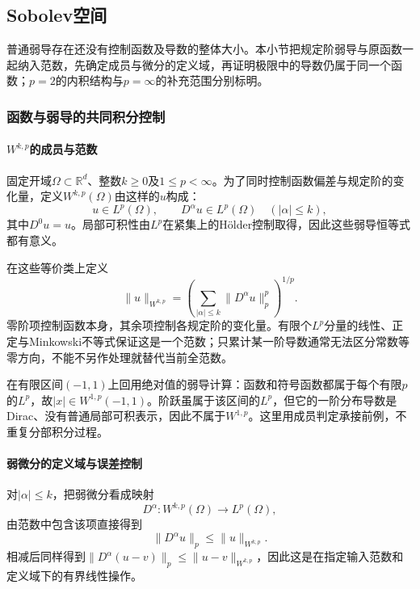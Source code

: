 \subsection{Sobolev空间}
\label{subsec:sobolev-spaces}

普通弱导存在还没有控制函数及导数的整体大小。本小节把规定阶弱导与原函数一起纳入范数，先确定成员与微分的定义域，再证明极限中的导数仍属于同一个函数；$p=2$的内积结构与$p=\infty$的补充范围分别标明。

\subsubsection{函数与弱导的共同积分控制}
\label{subsubsec:sobolev-members-norm}

\paragraph{$W^{k,p}$的成员与范数}

固定开域$\Omega\subset\mathbb R^d$、整数$k\ge0$及$1\le p<\infty$。为了同时控制函数偏差与规定阶的变化量，定义$W^{k,p}(\Omega)$由这样的$u$构成：
\[
  u\in L^p(\Omega),\qquad D^\alpha u\in L^p(\Omega)\quad(|\alpha|\le k),
\]
其中$D^0u=u$。局部可积性由$L^p$在紧集上的Hölder控制取得，因此这些弱导恒等式都有意义。

在这些等价类上定义
\begin{equation}
  \|u\|_{W^{k,p}}
  =\left(\sum_{|\alpha|\le k}\|D^\alpha u\|_p^p\right)^{1/p}.
  \label{eq:functional-sobolev-norm}
\end{equation}
零阶项控制函数本身，其余项控制各规定阶的变化量。有限个$L^p$分量的线性、正定与Minkowski不等式保证这是一个范数；只累计某一阶导数通常无法区分常数等零方向，不能不另作处理就替代当前全范数。

在有限区间$(-1,1)$上回用绝对值的弱导计算：函数和符号函数都属于每个有限$p$的$L^p$，故$|x|\in W^{1,p}(-1,1)$。阶跃虽属于该区间的$L^p$，但它的一阶分布导数是Dirac、没有普通局部可积表示，因此不属于$W^{1,p}$。这里用成员判定承接前例，不重复分部积分过程。

\paragraph{弱微分的定义域与误差控制}

对$|\alpha|\le k$，把弱微分看成映射
\[
  D^\alpha:W^{k,p}(\Omega)\to L^p(\Omega),
\]
由范数中包含该项直接得到
\[
  \|D^\alpha u\|_p\le\|u\|_{W^{k,p}}.
\]
相减后同样得到$\|D^\alpha(u-v)\|_p\le\|u-v\|_{W^{k,p}}$，因此这是在指定输入范数和定义域下的有界线性操作。

